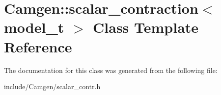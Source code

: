 \hypertarget{a00484}{\section{Camgen\-:\-:scalar\-\_\-contraction$<$ model\-\_\-t $>$ Class Template Reference}
\label{a00484}
}


The documentation for this class was generated from the following file\-:\begin{DoxyCompactItemize}
\item 
include/\-Camgen/scalar\-\_\-contr.\-h\end{DoxyCompactItemize}
